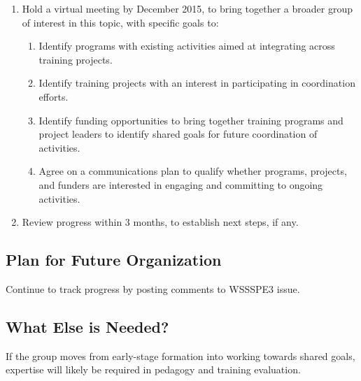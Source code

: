 \begin{enumerate}

\item Hold a virtual meeting by December 2015, to bring together a broader group
of interest in this topic, with specific goals to:

	\begin{enumerate}
	    
	\item Identify programs with existing activities aimed at integrating across
	training projects.
	        
	\item Identify training projects with an interest in participating in
	coordination efforts.
	        
	\item Identify funding opportunities to bring together training programs and
	project leaders to identify shared goals for future coordination of activities.
	        
	\item Agree on a communications plan to qualify whether programs, projects, and
	funders are interested in engaging and committing to ongoing activities.
	        
	\end{enumerate}
    
\item Review progress within 3 months, to establish next steps, if any.

\end{enumerate}

\subsection{Plan for Future Organization}

Continue to track progress by posting comments to WSSSPE3 issue.

\subsection{What Else is Needed?}

If the group moves from early-stage formation into working towards shared goals,
expertise will likely be required in pedagogy and training evaluation.

